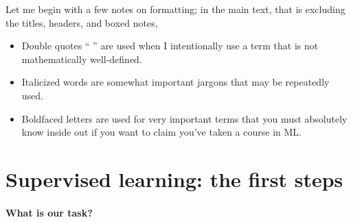 \documentclass{discussion}
\providecommand{\tightlist}{%
\setlength{\itemsep}{2pt}\setlength{\parskip}{0pt}}
\begin{document}


   


\renewcommand{\R}{\mathbb{R}}
\renewcommand{\vec}[1]{\mathbf{#1}}
\newcommand{\Dtrain}{\mathcal{D}_{\mathrm{train}}}
\newcommand{\tm}{\mathbf{\theta}_{\text{model}}}
\newcommand{\xtest}{\mathbf{\x}_{\text{test}}}
\newcommand{\test}{\mathrm{test}}
\newcommand{\pred}{\mathrm{pred}}

Let me begin with a few notes on formatting; in the main text, that is excluding the titles, headers, and boxed notes,
\begin{itemize}
\tightlist
  \item Double quotes `` '' are used when I intentionally use a term that
is not mathematically well-defined. 
\item Italicized words are somewhat important jargons that may be repeatedly used.
\item  Boldfaced letters are used for very important terms that you must absolutely know inside out if you want to claim you've taken a course in ML.
\end{itemize}

\section{Supervised learning: the first
steps}\label{supervised-learning-the-first-steps}

\paragraph{What is our task?}\label{what-is-our-task}
\end{document}
